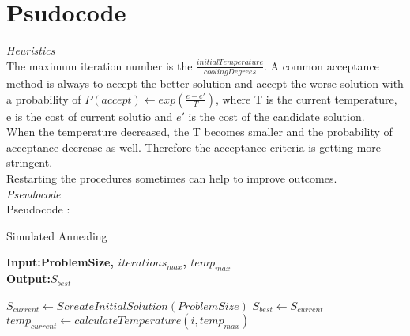 \documentclass[12pt]{article}
\begin{document}
\section{Psudocode}
\textit{Heuristics} \\
The maximum iteration number is the $\frac {initialTemperature}{cooling Degrees}. $
A common acceptance method is always to accept the better solution and accept the worse solution with a probability of $P(accept) \leftarrow exp(\frac{e-e'}{T})$, where T is the current temperature, e is the cost of current solutio and $e'$ is the cost of the candidate solution. \\
When the temperature decreased, the T becomes smaller and the probability of acceptance decrease as well. Therefore the acceptance criteria is getting more stringent. \\
Restarting the procedures sometimes can help to improve outcomes. \\


\textit{Pseudocode} \\
Pseudocode : \\
\begin{algorithm}
  \caption{Simulated Annealing}\label{euclid}
    \hspace*{\algorithmicindent} \textbf{Input:ProblemSize, $iterations_{max}$, $temp_{max}$} \\
    \hspace*{\algorithmicindent} \textbf{Output:{$S_{best}$}} 
  \begin{algorithmic}[4]

     \State $S_{current} \leftarrow S_{} createInitialSolution(ProblemSize)$
     \State $S_{best}  \leftarrow S_{current} $
     	 \State $temp_{current} \leftarrow calculateTemperature(i, temp_{max})$
     	 	\EndIf
     	 \EndIf
      \EndFor \\
    \EndFunction
  \end{algorithmic}
\end{algorithm} 
\\
\end{document}
